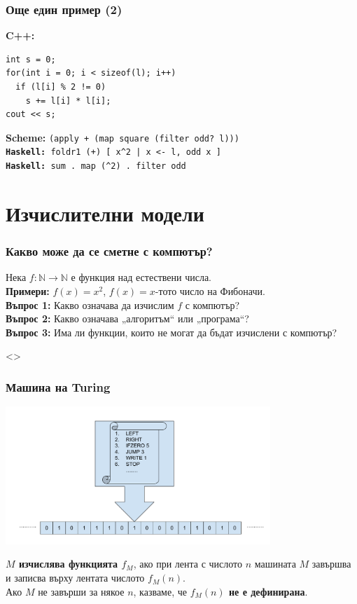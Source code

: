 \documentclass[alsotrans,beameroptions={aspectratio=169}]{beamerswitch}
\begin{document}
\begin{frame}[fragile]
  \frametitle{Още един пример (2)}
  \textbf{C++:}
\begin{verbatim}
int s = 0;
for(int i = 0; i < sizeof(l); i++)
  if (l[i] % 2 != 0)
    s += l[i] * l[i];
cout << s;
\end{verbatim}
  \pause
  \textbf{Scheme:} \tt{(apply + (map square (filter odd? l)))}\\[2ex]
  \pause
  \textbf{Haskell:} \tt{foldr1 (+) [ x\^{}2 | x <- l, odd x ]}\\[2ex]
  \pause
  \textbf{Haskell:} \tt{sum . map (\^{}2) . filter odd}
\end{frame}

\section*{Изчислителни модели}

\begin{frame}
  \frametitle{Какво може да се сметне с компютър?}

  Нека $f:\mathbb N\to\mathbb N$ е функция над естествени числа.\\[2ex]

  \textbf{Примери:} $f(x) = x^2$, $f(x) = x$-тото число на Фибоначи.\\[4ex]
  \pause
  \textbf{Въпрос 1:} Какво означава да изчислим $f$ с компютър?\\[4ex]
  \pause
  \textbf{Въпрос 2:} Какво означава „алгоритъм“ или „програма“?\\[4ex]
  \pause
  \textbf{Въпрос 3:} Има ли функции, които не могат да бъдат изчислени с компютър?
\end{frame}

\begin{frame}<>
  \frametitle{Машина на Turing}

  \vspace*{-4ex}
  \begin{center}
    \includegraphics[width=0.75\textwidth]{images/turing.pdf}
  \end{center}
  \pause
  \vspace*{-1ex}
  \textbf{$M$ изчислява функцията $f_M$}, ако при лента с числото $n$ машината $M$ завършва и записва върху лентата числото $f_M(n)$.\\
  \pause
  Ако $M$ не завърши за някое $n$, казваме, че \textbf{$f_M(n)$ не е дефинирана}.
\end{frame}
\end{document}
